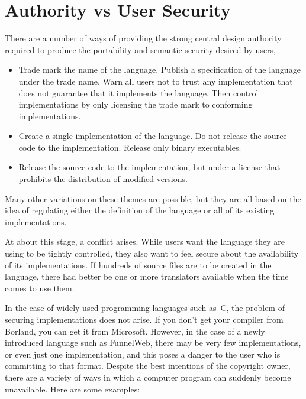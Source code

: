 \section{Authority vs User Security}

There are a number of ways of providing the
strong central design authority required to produce
the portability and semantic security desired by users,

\begin{itemize}

\item Trade mark
the name of the language. Publish a specification of the
language under the trade name. Warn all users not to trust any
implementation that does not guarantee that it implements the language.
Then control implementations by only licensing the trade mark to conforming
implementations.

\item Create a single implementation of the language. Do not release
the source code to the implementation. Release only binary executables.

\item Release the source code to the implementation, but under a license
that prohibits the distribution of modified versions.

\end{itemize}

Many other variations on these themes are possible, but they are all
based on the idea of regulating either the 
definition of the language
or all of its existing implementations.

At about this stage, a conflict arises. While users want the language
they are using to be tightly controlled, they also want to feel secure
about the availability of its implementations. If hundreds of source
files are to be created in the language, there had better be one or
more translators available when the time comes to use them.

In the case of widely-used programming languages such as~C, the problem of
securing implementations does not arise. If you don't get your
compiler from Borland, you can get it from Microsoft. However, in the
case of a newly introduced language such as FunnelWeb, there may be
very few implementations, or even just one implementation,
and this poses a danger to the
user who is committing to that format. Despite the best intentions of the
copyright owner, there are a variety of ways in which a computer
program can suddenly become
unavailable. Here are some examples:

